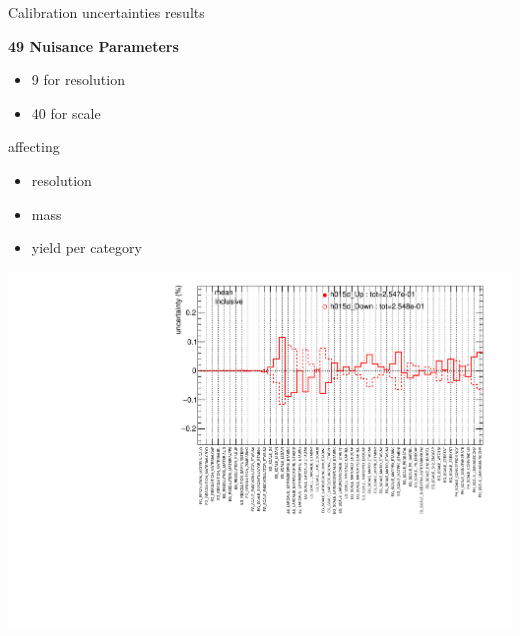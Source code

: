 \begin{frame}{Calibration uncertainties results}

  \begin{minipage}{0.49\linewidth}
    \centering
    {\bf 49 Nuisance Parameters }
    \begin{itemize}
    \item 9 for resolution
    \item 40 for scale
    \end{itemize}
    \vfill
    affecting
    \begin{itemize}
    \item resolution
    \item mass
    \item yield per category
      \end{itemize}
  \end{minipage}
  \hfill
  \begin{minipage}{0.49\linewidth}
    \includegraphics[width=\linewidth]{Figures/h015d_FULLMerge_catMerge_Systematics_Inclusive_mean_mean.pdf}
  \end{minipage}


\end{frame}
